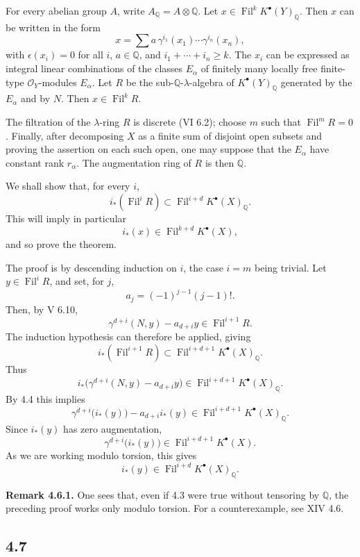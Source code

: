 \documentclass[11pt]{article}
\newcommand{\Fil}{\operatorname{Fil}}
\begin{document}
For every abelian group \(A\), write \(A_{\mathbb Q}=A\otimes\mathbb Q\). Let \(x\in\Fil^kK^\bullet(Y)_{\mathbb Q}\). Then \(x\) can be written in the form
\[
  x=\sum a\,\gamma^{i_1}(x_1)\cdots\gamma^{i_n}(x_n),
\]
with \(\epsilon(x_i)=0\) for all \(i\), \(a\in\mathbb Q\), and \(i_1+\cdots+i_n\ge k\). The \(x_i\) can be expressed as integral linear combinations of the classes \(E_\alpha\) of finitely many locally free finite-type \(\mathcal O_Y\)-modules \(E_\alpha\). Let \(R\) be the sub-\(\mathbb Q\)-\(\lambda\)-algebra of \(K^\bullet(Y)_{\mathbb Q}\) generated by the \(E_\alpha\) and by \(N\). Then \(x\in\Fil^kR\).

The filtration of the \(\lambda\)-ring \(R\) is discrete (VI 6.2); choose \(m\) such that \(\Fil^mR=0\). Finally, after decomposing \(X\) as a finite sum of disjoint open subsets and proving the assertion on each such open, one may suppose that the \(E_\alpha\) have constant rank \(r_\alpha\). The augmentation ring of \(R\) is then \(\mathbb Q\).

We shall show that, for every \(i\),
\[
  i_*(\Fil^iR)\subset \Fil^{i+d}K^\bullet(X)_{\mathbb Q}.
\]
This will imply in particular
\[
  i_*(x)\in\Fil^{k+d}K^\bullet(X),
\]
and so prove the theorem.

The proof is by descending induction on \(i\), the case \(i=m\) being trivial. Let \(y\in\Fil^iR\), and set, for \(j\),
\[
  a_j=(-1)^{j-1}(j-1)!.
\]
Then, by V 6.10,
\[
  \gamma^{d+i}(N,y)-a_{d+i}y\in\Fil^{i+1}R.
\]
The induction hypothesis can therefore be applied, giving
\[
  i_*(\Fil^{i+1}R)\subset\Fil^{i+d+1}K^\bullet(X)_{\mathbb Q}.
\]
Thus
\[
  i_*\bigl(\gamma^{d+i}(N,y)-a_{d+i}y\bigr)
  \in\Fil^{i+d+1}K^\bullet(X)_{\mathbb Q}.
\]
By 4.4 this implies
\[
  \gamma^{d+i}\bigl(i_*(y)\bigr)-a_{d+i}i_*(y)
  \in\Fil^{i+d+1}K^\bullet(X)_{\mathbb Q}.
\]
Since \(i_*(y)\) has zero augmentation,
\[
  \gamma^{d+i}\bigl(i_*(y)\bigr)\in\Fil^{i+d+1}K^\bullet(X).
\]
As we are working modulo torsion, this gives
\[
  i_*(y)\in\Fil^{i+d}K^\bullet(X)_{\mathbb Q}.
\]

\textbf{Remark 4.6.1.} One sees that, even if 4.3 were true without tensoring by \(\mathbb Q\), the preceding proof works only modulo torsion. For a counterexample, see XIV 4.6.

\subsection*{4.7}
\end{document}
